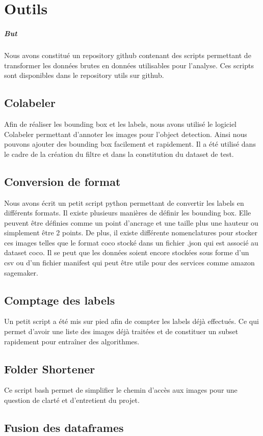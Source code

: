 \chapter{Outils}

\paragraph*{But}

Nous avons constitué un repository github contenant des scripts permettant de transformer les données brutes en données utilisables pour l'analyse. Ces scripts sont disponibles dans le repository utils sur github.

\section{Colabeler}

Afin de réaliser les bounding box et les labels, nous avons utilisé le logiciel Colabeler permettant d'annoter les images pour l'object detection. Ainsi nous pouvons ajouter des bounding box facilement et rapidement. Il a été utilisé dans le cadre de la création du filtre et dans la constitution du dataset de test.

\section{Conversion de format}

Nous avons écrit un petit script python permettant de convertir les labels en différents formats. Il existe plusieurs manières de définir les bounding box. Elle peuvent être définies comme un point d'ancrage et une taille plus une hauteur ou simplement être 2 points. De plus, il existe différente nomenclatures pour stocker ces images telles que le format coco stocké dans un fichier .json qui est associé au dataset coco. Il se peut que les données soient encore stockées sous forme d'un csv ou d'un fichier manifest qui peut être utile pour des services comme amazon sagemaker.

\section{Comptage des labels}

Un petit script a été mis sur pied afin de compter les labels déjà effectués. Ce qui permet d'avoir une liste des images déjà traitées et de constituer un subset rapidement pour entraîner des algorithmes.

\section{Folder Shortener}

Ce script bash permet de simplifier le chemin d'accès aux images pour une question de clarté et d'entretient du projet.

\section{Fusion des dataframes}


